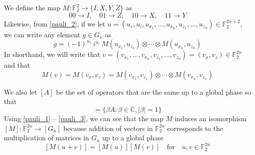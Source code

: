 \message{ !name(report_1.tex)}\documentclass[11pt]{article}
\theoremstyle{definition}
\theoremstyle{plain}
\begin{document}
We define the map $M: \mathbb{F}_2^2 \rightarrow \{I, X, Y, Z\}$ as
\begin{equation}
  00 \rightarrow I, \quad 01 \rightarrow Z, \quad 10 \rightarrow X, \quad
  11 \rightarrow Y 
\end{equation}
Likewise, from {\ref{pauli_2}}, if we let $u = (u_s, u_i, u_{x_1}, \ldots, u_{x_n}, u_{z_1}, \ldots, u_{z_n}) \in \mathbb{F}_2^{2n+2}$, we can write any element $g \in G_n$ as
\begin{equation}
  g = {(-1)}^{u_s} \ i^{u_i} \ M(u_{x_1}, u_{z_1}) \otimes \cdots \otimes
  M(u_{x_n}, u_{z_n}) 
\end{equation}
In shorthand, we will write that $v = (v_{x_1}, \ldots, v_{x_n}, v_{z_1}, \ldots, v_{z_n}) = (v_x, v_z) \in \mathbb{F}_2^{2n}$ and that
\begin{equation}\label{shorthand_1}
  M(v) = M(v_x, v_z) = M(v_{x_1}, v_{z_1}) \otimes \cdots \otimes
  M(v_{x_n}, v_{z_n}) 
\end{equation}

We also let $[A]$ be the set of operators that are the same up to a global phase so that
\begin{equation}
  [A] = \{\beta A : \beta \in \mathbb{C} , |\beta| = 1 \}
\end{equation}
Using {\ref{pauli_1}} {--} {\ref{pauli_3}}, we can see that the map $M$ induces an isomorphism $[M]: \mathbb{F}_2^{2n} \rightarrow [G_n]$ because addition of vectors in $\mathbb{F}_2^{2n}$ corresponds to the multiplication of matrices in $G_n$ up to a global phase
\begin{equation}\label{isomorphism} 
  [M(u + v)] = [M(u)][M(v)] \quad \text{for} \quad u, v \in \mathbb{F}_2^{2n}
\end{equation}
\end{document}
